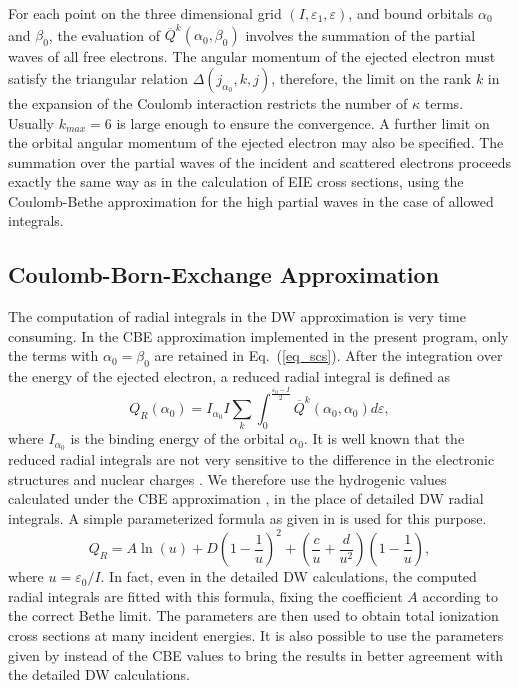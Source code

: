 For each point on the three dimensional grid $(I,\varepsilon_1, \varepsilon)$,
and bound orbitals $\alpha_0$ and $\beta_0$, the evaluation of
$\overline{Q}^k(\alpha_0,\beta_0)$ involves the summation of the 
partial waves of all free electrons. The angular momentum of the ejected
electron must satisfy the triangular relation $\Delta(j_{\alpha_0}, k, j)$,
therefore, the limit on the rank $k$ in the expansion of the Coulomb
interaction restricts the number of $\kappa$ terms. Usually $k_{max} = 6$ is
large enough to ensure the convergence. A further limit on the orbital angular
momentum of 
the ejected electron may also be specified. The summation over the partial
waves of the incident and scattered electrons proceeds exactly the same way as
in the calculation of EIE cross sections, using the Coulomb-Bethe
approximation for the high partial waves in the case of allowed integrals.

\subsection{Coulomb-Born-Exchange Approximation}
The computation of radial integrals in the DW approximation is very time
consuming. In the CBE approximation implemented in the present program, only
the terms with $\alpha_0 = \beta_0$ are retained in Eq.~(\ref{eq_scs}). After
the integration over the energy of the ejected electron, a reduced radial
integral is defined as 
\begin{equation}
\label{eq_reduced}
Q_R(\alpha_0) = I_{\alpha_0}I
\sum_k\int_0^{\frac{\varepsilon_0-I}{2}}
\overline{Q}^k(\alpha_0,\alpha_0)d\varepsilon,
\end{equation}
where $I_{\alpha_0}$ is the binding energy of the orbital $\alpha_0$. It is well
known that the reduced radial integrals are not very sensitive to the difference
in the electronic structures and nuclear charges \cite{zhang90}. We therefore
use the hydrogenic values calculated under the CBE approximation
\cite{golden:1977a, golden:1980a}, in the place of detailed DW radial integrals.
A simple parameterized formula as given in \citet{zhang90} is used for this
purpose. 
\begin{equation}
Q_R = A\ln(u)+D\left(1-\frac{1}{u}\right)^2+
\left(\frac{c}{u}+\frac{d}{u^2}\right)\left(1-\frac{1}{u}\right),
\end{equation}
where $u=\varepsilon_0/I$. In fact, even in the detailed DW calculations, the
computed radial integrals are fitted with this formula, fixing the coefficient
$A$ according to the correct Bethe limit. The parameters are then used to
obtain total ionization cross sections at many incident energies. It is also
possible to use the parameters given by \citet{fontes93} instead of the CBE
values to bring the results in better agreement with the detailed DW
calculations. 

